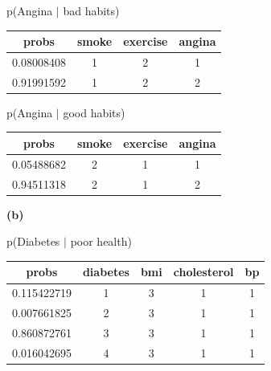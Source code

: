 \documentclass[11pt]{article}
\begin{document}
p(Angina $|$ bad habits)

\begin{table}[!hbt]
\begin{center}
\begin{tabular}{ |c|c|c|c| }
  \hline
  probs & smoke & exercise & angina \\
  \hline
 0.08008408 & 1 & 2 & 1 \\
  \hline
 0.91991592 & 1 & 2 & 2 \\
  \hline
\end{tabular}
\end{center}
\end{table}
\vspace{-20pt}

p(Angina $|$ good habits)

\begin{table}[!hbt]
\begin{center}
\begin{tabular}{ |c|c|c|c| }
  \hline
  probs & smoke & exercise & angina \\
  \hline
 0.05488682 & 2 & 1 & 1 \\
  \hline
 0.94511318 & 2 & 1 & 2 \\
  \hline
\end{tabular}
\end{center}
\end{table}

\vspace{-20pt}

\par \textbf{(b)}

p(Diabetes $|$ poor health)

\begin{table}[!hbt]
\begin{center}
\begin{tabular}{ |c|c|c|c|c| }
  \hline
  probs & diabetes & bmi & cholesterol & bp \\
  \hline
  0.115422719 & 1 & 3 & 1 & 1\\
  \hline
  0.007661825 & 2 & 3 & 1 & 1 \\
  \hline
  0.860872761  & 3  &  3 &  1 & 1 \\
  \hline
  0.016042695  &   4    & 3   & 1 & 1 \\
  \hline
\end{tabular}
\end{center}
\end{table}
\vspace{-20pt}
\end{document}

